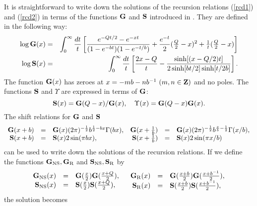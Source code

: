 \documentclass[a4paper,12pt]{article}
\newcommand{\tfrac}[2]{{\textstyle\frac{#1}{#2}}}
\newcommand{\Up}{{\Upsilon}}
\newcommand{\NS}{{\rm NS}}
\newcommand{\R}{{\rm R}}
\newcommand{\bG}{{\bf G}}
\newcommand{\bS}{{\bf S}}
\begin{document}
   It is straightforward to write down the solutions of the recursion
 relations (\ref{rcd1}) and (\ref{rcd2}) in terms of
 the functions $\bG$ and $\bS$ introduced in \cite{FZZ}.
 They are defined in the following way:
\begin{eqnarray}
  \log \bG(x)&=& \int_0^\infty \frac{dt}{t}\left[
    \frac{e^{-Qt/2}-e^{-xt}}{(1-e^{-bt})(1-e^{-t/b})}
   +\frac{e^{-t}}{2}(\tfrac{Q}{2}-x)^2 +\tfrac{1}{t}(\tfrac{Q}{2}-x) \right] \\
  \log \bS(x) &=&
  \int_0^\infty \frac{dt}{t}\left[\frac{2x-Q}{t}
     -\frac{\sinh[(x-Q/2)t]}{2\sinh[bt/2]\sinh[t/2b]}\right].
\end{eqnarray}
 The function $\bG(x)$ has zeroes at
 $x=-mb-nb^{-1}~(m,n\in {\bf Z})$ and no poles.
 The functions $\bS$ and $\Up$ are expressed in terms of $\bG$:
\begin{equation}
  \bS(x)=\bG(Q-x)/\bG(x),~~~
  \Up(x)=\bG(Q-x)\bG(x).
\end{equation}
 The shift relations for $\bG$ and $\bS$
\begin{equation}
\begin{array}{rcl}
  \bG(x+b)      &=& \bG(x)(2\pi)^{-\frac{1}{2}}b^{\frac{1}{2}-bx}\Gamma(bx),\\
  \bS(x+b)      &=& \bS(x)2\sin(\pi bx),
\end{array}
\begin{array}{rcl}
  \bG(x+\tfrac{1}{b}) &=& \bG(x)
   (2\pi)^{-\frac{1}{2}}b^{\frac{x}{b}-\frac{1}{2}}\Gamma(x/b),\\
  \bS(x+\tfrac{1}{b}) &=& \bS(x)2\sin(\pi x/b)
\end{array}
\end{equation}
 can be used to write down the solutions of the recursion relations.
 If we define the functions $\bG_\NS,\bG_\R$ and $\bS_\NS,\bS_\R$ by
\begin{equation}
\begin{array}{rcl}
  \bG_\NS(x)&=&\bG(\tfrac{x}{2})\bG(\tfrac{x+Q}{2}),\\
  \bS_\NS(x)&=&\bS(\tfrac{x}{2})\bS(\tfrac{x+Q}{2}),
\end{array}
~~
\begin{array}{rcl}
  \bG_\R(x)&=&\bG(\tfrac{x+b}{2})\bG(\tfrac{x+b^{-1}}{2}),\\
  \bS_\R(x)&=&\bS(\tfrac{x+b}{2})\bS(\tfrac{x+b^{-1}}{2}),
\end{array}
\end{equation}
   the solution becomes
\end{document}

